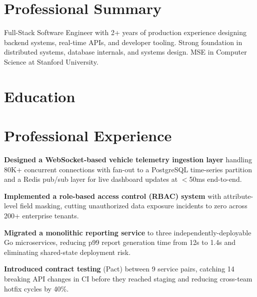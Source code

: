 
\section{Professional Summary}

Full-Stack Software Engineer with 2+ years of production experience designing backend systems, real-time APIs, and developer tooling. Strong foundation in distributed systems, database internals, and systems design. MSE in Computer Science at Stanford University.

\section{Education}



\section{Professional Experience}

\begin{rlist}
  \item \textbf{Designed a WebSocket-based vehicle telemetry ingestion layer} handling 80K+ concurrent connections with fan-out to a PostgreSQL time-series partition and a Redis pub/sub layer for live dashboard updates at $<$50ms end-to-end.
  \item \textbf{Implemented a role-based access control (RBAC) system} with attribute-level field masking, cutting unauthorized data exposure incidents to zero across 200+ enterprise tenants.
  \item \textbf{Migrated a monolithic reporting service} to three independently-deployable Go microservices, reducing p99 report generation time from 12s to 1.4s and eliminating shared-state deployment risk.
  \item \textbf{Introduced contract testing} (Pact) between 9 service pairs, catching 14 breaking API changes in CI before they reached staging and reducing cross-team hotfix cycles by 40\%.
\end{rlist}

